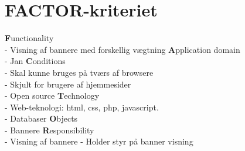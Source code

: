 \documentclass[a4paper,12pt]{article}
\begin{document}
\section{FACTOR-kriteriet}

\large{\bf{F}}\normalsize{unctionality
\\
- Visning af bannere med forskellig vægtning}
\newline
\newline
\large{\bf{A}}\normalsize{pplication domain
\\
- Jan}
\newline
\newline
\large{\bf{C}}\normalsize{onditions\\
- Skal kunne bruges på tværs af browsere\\
- Skjult for brugere af hjemmesider\\
- Open source}
\newline
\newline
\large{\bf{T}}\normalsize{echnology\\
- Web-teknologi: html, css, php, javascript.\\
- Databaser}
\newline
\newline
\large{\bf{O}}\normalsize{bjects\\
- Bannere}
\newline
\newline
\large{\bf{R}}\normalsize{esponsibility\\
- Visning af bannere
- Holder styr på banner visning}

\newpage
\end{document}
